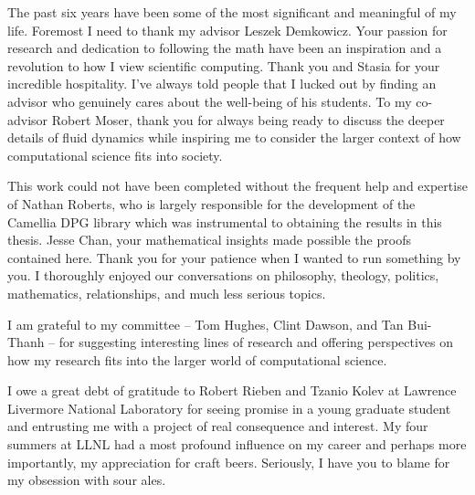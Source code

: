 \documentclass[12pt]{report} %
\begin{document}
\begin{acknowledgments}		%
%
The past six years have been some of the most significant and meaningful of my life. 
Foremost I need to thank my advisor Leszek Demkowicz. 
Your passion for research and dedication to following the math have been an inspiration and a revolution
to how I view scientific computing.
Thank you and Stasia for your incredible hospitality. 
I've always told people that I lucked out by finding an advisor who genuinely cares about the well-being of his students.
To my co-advisor Robert Moser, thank you for always being ready to discuss the deeper details of fluid dynamics 
while inspiring me to consider the larger context of how computational science fits into society.

This work could not have been completed without the frequent help and expertise of Nathan Roberts, who is largely responsible
for the development of the Camellia DPG library which was instrumental to obtaining the results in this thesis.
Jesse Chan, your mathematical insights made possible the proofs contained here.
Thank you for your patience when I wanted to run something by you.
I thoroughly enjoyed our conversations on philosophy, theology, politics, mathematics, relationships, and much 
less serious topics. 

I am grateful to my committee -- Tom Hughes, Clint Dawson, and Tan Bui-Thanh -- for suggesting interesting lines of research
and offering perspectives on how my research fits into the larger world of computational science.

I owe a great debt of gratitude to Robert Rieben and Tzanio Kolev at Lawrence Livermore National Laboratory for seeing promise
in a young graduate student and entrusting me with a project of real consequence and interest.
My four summers at LLNL had a most profound influence on my career and perhaps more importantly, my appreciation for craft beers.
Seriously, I have you to blame for my obsession with sour ales. 


\end{acknowledgments}
\end{document}
